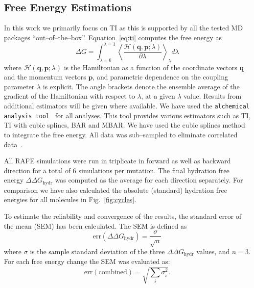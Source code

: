 \documentclass[journal=jctcce,manuscript=article]{achemso}
\newcommand{\progname}[1]{\texttt{#1}}
\renewcommand{\vec}[1]{\mathbf{#1}}
\begin{document}
\newpage

\subsection{Free Energy Estimations}
\label{sec:analysis}

In this work we primarily focus on TI as this is supported by all the
tested MD packages ``out--of--the--box''. Equation~\ref{eq:ti}
computes the free energy as \begin{equation}\label{eq:ti}
  \Delta G = \int_{\lambda=0}^{\lambda=1}
  \left\langle
  \frac{\mathscr{H}(\vec{q},\vec{p};\lambda)}{\partial\lambda}\right\rangle_\lambda
  d\lambda
\end{equation}
where $\mathscr{H}(\vec{q},\vec{p};\lambda)$ is the Hamiltonian as a
function of the coordinate vectors $\vec{q}$ and the momentum vectors
$\vec{p}$, and parametric dependence on the coupling parameter
$\lambda$ is explicit.  The angle brackets denote the ensemble average
of the gradient of the Hamiltonian with respect to $\lambda$, at a
given $\lambda$ value.  Results from additional
estimators will be given where available.  We have used the
\progname{alchemical analysis tool}~\cite{klimovich_guidelines_2015}
for all analyses.  This tool provides various estimators such as TI,
TI with cubic splines, BAR and MBAR.  We have used the cubic splines
method to integrate the free energy.  All data was sub--sampled to
eliminate correlated data~\cite{doi:10.1021/ct0502864}.

All RAFE simulations were run in triplicate in forward as well as
backward direction for a total of 6 simulations per mutation.  The
final hydration free energy $\Delta\Delta G_{\mathrm{hydr}}$ was
computed as the average for each direction separately.  For comparison we have also calculated the absolute (standard) hydration free energies for all molecules in Fig.~\ref{fig:cycles}.

To estimate the reliability and convergence of the results, the
standard error of the mean (SEM) has been calculated.  The SEM is
defined as
\begin{equation}
  \label{eq:sem}
  \mathrm{err}(\Delta\Delta G_{\mathrm{hydr}}) = \frac{\sigma}{\sqrt{n}}
\end{equation}
where $\sigma$ is the sample standard deviation of the three $\Delta \Delta G_{\mathrm{hydr}}$ values, and $n=3$.
For each free energy change the SEM was evaluated as:
\begin{equation}
  \label{eq:sem-comb}
  \mathrm{err}(\mathrm{combined}) = \sqrt{\sum_i \sigma_i^2}.
\end{equation}
\end{document}

